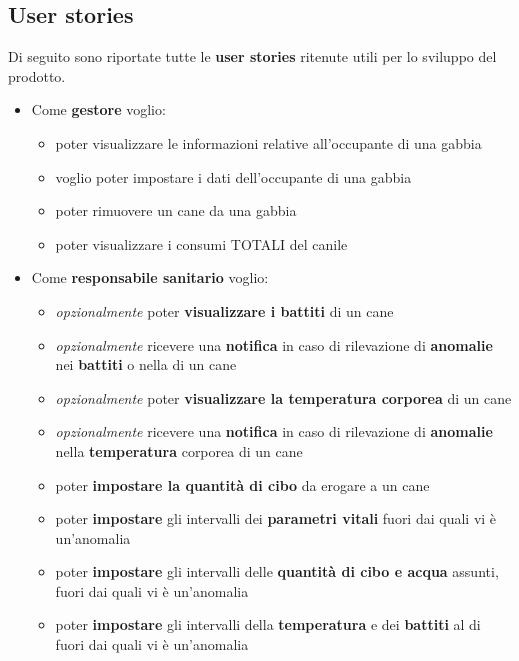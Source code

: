         \subsection{User stories}
        Di seguito sono riportate tutte le \textbf{user stories} ritenute utili per lo sviluppo del prodotto.
        \begin{itemize}
            \item Come \textbf{gestore} voglio:
            \begin{itemize}
                \item poter visualizzare le informazioni relative all’occupante di una gabbia
                \item voglio poter impostare i dati dell’occupante di una gabbia
                \item poter rimuovere un cane da una gabbia
                \item poter visualizzare i consumi TOTALI del canile
            \end{itemize}
            \item Come \textbf{responsabile sanitario} voglio:
            \begin{itemize}
                    \item \textit{opzionalmente} poter \textbf{visualizzare i battiti} di un cane 
                    \item  \textit{opzionalmente} ricevere una \textbf{notifica} in caso di rilevazione di \textbf{anomalie} nei \textbf{battiti} o nella di un cane
                    \item \textit{opzionalmente} poter \textbf{visualizzare la temperatura corporea} di un cane
                    \item \textit{opzionalmente} ricevere una \textbf{notifica} in caso di rilevazione di \textbf{anomalie} nella \textbf{temperatura} corporea di un cane
                    \item poter \textbf{impostare la quantità di cibo} da erogare a un cane
                    \item poter \textbf{impostare} gli intervalli dei \textbf{parametri vitali} fuori dai quali vi è un’anomalia
                    \item poter \textbf{impostare} gli intervalli delle \textbf{quantità di cibo e acqua } assunti, fuori dai quali vi è un’anomalia
                    \item poter \textbf{impostare} gli intervalli della \textbf{temperatura} e dei \textbf{battiti} al di fuori dai quali vi è un’anomalia

\end{itemize}
\end{itemize}
